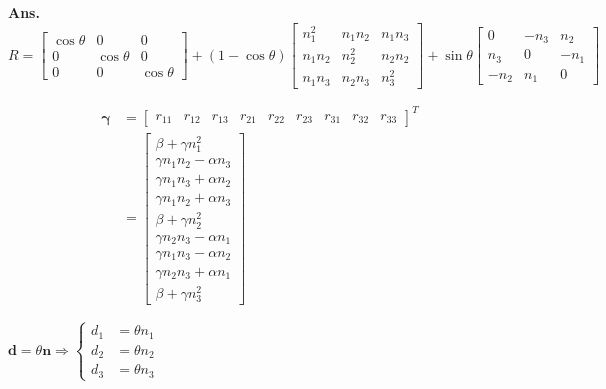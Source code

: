 \documentclass[12pt, a4paper, UTF8, fontset=windows]{ctexbook}
\newenvironment{solution}{\par\noindent\textbf{Ans.}}{\par}
\begin{document}
\begin{solution}
    $$
    R = 
    \begin{bmatrix}
        \cos \theta & 0 & 0 \\
        0 & \cos \theta & 0 \\
        0 & 0 & \cos \theta
    \end{bmatrix}
    + (1 - \cos \theta)
    \begin{bmatrix}
        n_1^2 & n_1 n_2 & n_1 n_3 \\
        n_1 n_2 & n_2^2 & n_2 n_2 \\
        n_1 n_3 & n_2 n_3 & n_3^2
    \end{bmatrix}
    + \sin \theta
    \begin{bmatrix}
        0 & -n_3 & n_2 \\
        n_3 & 0 & -n_1 \\
        -n_2 & n_1 & 0
    \end{bmatrix}
    $$

    \begin{align*}
    \mathbf{\gamma}
    &=
    \begin{bmatrix} r_{11} & r_{12} & r_{13} & r_{21} & r_{22} & r_{23} & r_{31} & r_{32} & r_{33} \end{bmatrix}^T \\
    &=
    \begin{bmatrix}
        \beta + \gamma n_1^2 \\
        \gamma n_1 n_2 - \alpha n_3 \\
        \gamma n_1 n_3 + \alpha n_2 \\
        \gamma n_1 n_2 + \alpha n_3 \\
        \beta + \gamma n_2^2 \\
        \gamma n_2 n_3 - \alpha n_1 \\
        \gamma n_1 n_3 - \alpha n_2 \\ 
        \gamma n_2 n_3 + \alpha n_1 \\
        \beta + \gamma n_3^2
    \end{bmatrix}
    \end{align*}

    

    $
    \mathbf{d}=\theta\mathbf{n} 
    \Rightarrow
    \begin{cases}
        d_1 &= \theta n_1 \\
        d_2 &= \theta n_2 \\
        d_3 &= \theta n_3
    \end{cases}
    $


\end{solution}
\end{document}
